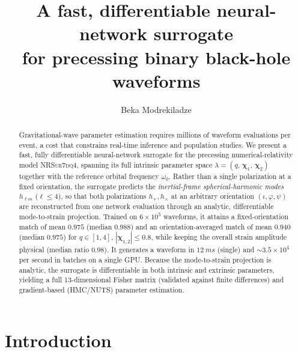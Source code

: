 \documentclass[aps,prd,twocolumn,superscriptaddress,longbibliography]{revtex4-2}
\newcommand{\NRSur}{\textsc{NRSur7dq4}}
\begin{document}
\title{A fast, differentiable neural-network surrogate\\
       for precessing binary black-hole waveforms}

\author{Beka Modrekiladze}





\begin{abstract}
Gravitational-wave parameter estimation requires millions of waveform
evaluations per event, a cost that constrains real-time inference and
population studies.
We present a fast, fully differentiable neural-network surrogate for the
precessing numerical-relativity model \NRSur{}, spanning its full
intrinsic parameter space
$\lambda=(q,\,\boldsymbol{\chi}_1,\,\boldsymbol{\chi}_2)$
together with the reference orbital frequency $\omega_0$.
Rather than a single polarization at a fixed orientation, the surrogate
predicts the \emph{inertial-frame spherical-harmonic modes} $h_{\ell m}$
($\ell\leq 4$), so that both polarizations $h_+,h_\times$ at an arbitrary
orientation $(\iota,\varphi,\psi)$ are reconstructed from one network
evaluation through an analytic, differentiable mode-to-strain projection.
Trained on $6\times10^5$ waveforms, it attains a fixed-orientation match
of mean $0.975$ (median $0.988$) and an orientation-averaged match of
mean $0.940$ (median $0.975$) for $q\in[1,4]$, $|\boldsymbol{\chi}_{1,2}|\leq 0.8$,
while keeping the overall strain amplitude physical (median ratio $0.98$).
It generates a waveform in $\SI{12}{ms}$ (single) and ${\sim}3.5\times10^4$
per second in batches on a single GPU. Because the mode-to-strain projection is analytic, the surrogate is
differentiable in both intrinsic and extrinsic parameters, yielding a full
13-dimensional Fisher matrix (validated against finite differences) and
gradient-based (HMC/NUTS) parameter estimation.
\end{abstract}

\maketitle

\section{Introduction}
\label{sec:intro}
\end{document}

